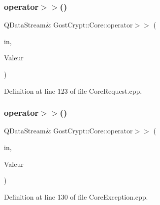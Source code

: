 \mbox{\label{namespace_gost_crypt_1_1_core_afa72d8e7476ba374c78482674682fcf0}} 
\subsubsection{\texorpdfstring{operator$>$$>$()}{operator>>()}\hspace{0.1cm}{\footnotesize\ttfamily [19/56]}}
{\footnotesize\ttfamily Q\+Data\+Stream\& Gost\+Crypt\+::\+Core\+::operator$>$$>$ (\begin{DoxyParamCaption}\item[{Q\+Data\+Stream \&}]{in,  }\item[{\hyperlink{struct_gost_crypt_1_1_core_1_1_create_key_file_request}{Create\+Key\+File\+Request} \&}]{Valeur }\end{DoxyParamCaption})}



Definition at line 123 of file Core\+Request.\+cpp.

\mbox{\label{namespace_gost_crypt_1_1_core_ad20b3beb363014a26b1c00e5037cf6b9}} 
\subsubsection{\texorpdfstring{operator$>$$>$()}{operator>>()}\hspace{0.1cm}{\footnotesize\ttfamily [20/56]}}
{\footnotesize\ttfamily Q\+Data\+Stream\& Gost\+Crypt\+::\+Core\+::operator$>$$>$ (\begin{DoxyParamCaption}\item[{Q\+Data\+Stream \&}]{in,  }\item[{\hyperlink{class_gost_crypt_1_1_core_1_1_mount_filesystem_manager_exception}{Gost\+Crypt\+::\+Core\+::\+Mount\+Filesystem\+Manager\+Exception} \&}]{Valeur }\end{DoxyParamCaption})}



Definition at line 130 of file Core\+Exception.\+cpp.

\mbox{\label{namespace_gost_crypt_1_1_core_a8c89beaede22c1bdfe978d8ab3f1e542}} 

